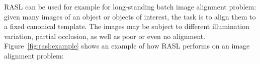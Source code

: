 RASL can be used for example for long-standing batch image alignment problem: given many images of an object or objects of interest, the task is to align them to a fixed canonical template. The images may be subject to different illumination variation, partial occlusion, as well as poor or even no alignment. Figure~\ref{fig:rasl:example} shows an example of how RASL performs on an image alignment problem:

\begin{figure}[h!]
  \centering
  ~
  ~
  \\ 

\end{figure}
